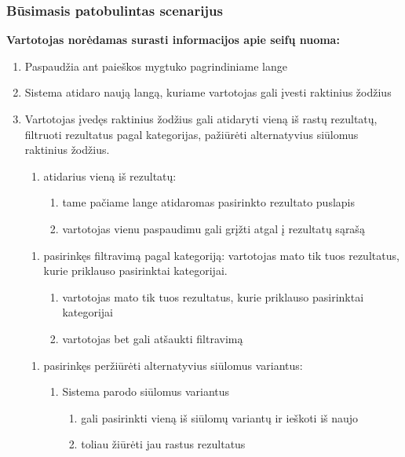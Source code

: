 \documentclass{VUMIFPSkursinis}
\begin{document}
\subsubsection{Būsimasis patobulintas scenarijus}
\begin{center}
	\textbf{Vartotojas norėdamas surasti informacijos apie seifų nuoma:}
\end{center}
\begin{enumerate}
	\item Paspaudžia ant paieškos mygtuko pagrindiniame lange
	\item Sistema atidaro naują langą, kuriame vartotojas gali įvesti raktinius žodžius
	\item Vartotojas įvedęs raktinius žodžius gali atidaryti vieną iš rastų rezultatų, filtruoti rezultatus pagal kategorijas, pažiūrėti alternatyvius siūlomus raktinius žodžius.
	\begin{enumerate}
		\item atidarius vieną iš rezultatų:
		\begin{enumerate}
			\item tame pačiame lange atidaromas pasirinkto rezultato puslapis
			\item vartotojas vienu paspaudimu gali grįžti atgal į rezultatų sąrašą
		\end{enumerate}
	\end{enumerate}
	\begin{enumerate}
		\item pasirinkęs filtravimą pagal kategoriją: vartotojas mato tik tuos rezultatus, kurie priklauso pasirinktai kategorijai.
		\begin{enumerate}
			\item vartotojas mato tik tuos rezultatus, kurie priklauso pasirinktai kategorijai
			\item vartotojas bet gali atšaukti filtravimą
		\end{enumerate}
	\end{enumerate}
	\begin{enumerate}
		\item pasirinkęs peržiūrėti alternatyvius siūlomus variantus:
		\begin{enumerate}
			\item Sistema parodo siūlomus variantus
			\begin{enumerate}
			\item gali pasirinkti vieną iš siūlomų variantų ir ieškoti iš naujo
			\item toliau žiūrėti jau rastus rezultatus
			\end{enumerate}
		\end{enumerate}
	\end{enumerate}
\end{enumerate}
\end{document}
